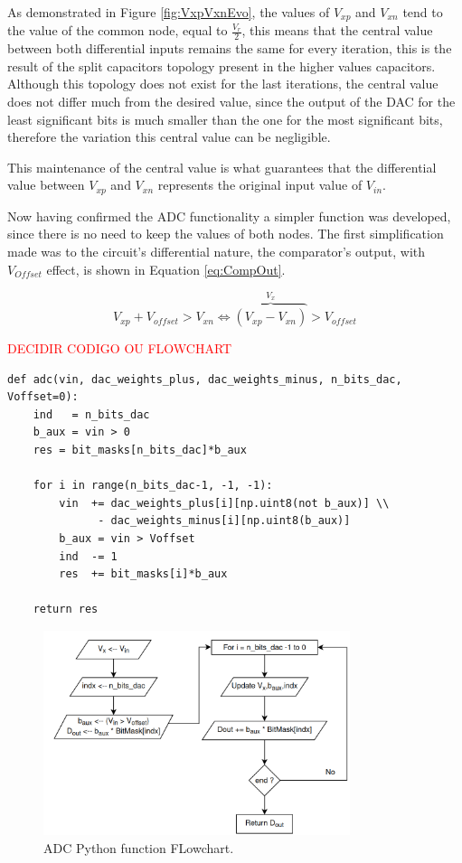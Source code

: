 As demonstrated in Figure \ref{fig:VxpVxnEvo}, the values of $V_{xp}$ and $V_{xn}$ tend to the value of the common node, equal to $\frac{V_r}{2}$, this means that the central value between both differential inputs remains the same for every iteration, this is the result of the split capacitors topology present in the higher values capacitors. Although this topology does not exist for the last iterations, the central value does not differ much from the desired value, since the output of the DAC for the least significant bits is much smaller than the one for the most significant bits, therefore the variation this central value can be negligible.

This maintenance of the central value is what guarantees that the differential value between $V_{xp}$ and $V_{xn}$ represents the original input value of $V_{in}$.

Now having confirmed the ADC functionality a simpler function was developed, since there is no need to keep the values of both nodes.
The first simplification made was to the circuit's differential nature, the comparator's output, with $V_{Offset}$ effect, is shown in Equation \ref{eq:CompOut}.

\begin{equation}
    V_{xp} + V_{offset} > V_{xn} \Leftrightarrow \overbrace{( V_{xp} - V_{xn} )}^{V_x} > V_{offset} 
    \label{eq:CompOut}
\end{equation}

\textcolor{red}{DECIDIR CODIGO OU FLOWCHART}

\begin{lstlisting}[caption={ADC Function}]
def adc(vin, dac_weights_plus, dac_weights_minus, n_bits_dac, Voffset=0):
    ind   = n_bits_dac  
    b_aux = vin > 0
    res = bit_masks[n_bits_dac]*b_aux

    for i in range(n_bits_dac-1, -1, -1):
        vin  += dac_weights_plus[i][np.uint8(not b_aux)] \\
              - dac_weights_minus[i][np.uint8(b_aux)]
        b_aux = vin > Voffset
        ind  -= 1
        res  += bit_masks[i]*b_aux

    return res
\end{lstlisting}


\begin{figure}[h]

    \centering
    \includegraphics*[width=0.8\textwidth]{Images/ADCPythonFlowChart.png}
    \caption{ADC Python function FLowchart.}

    \label{fig:ADCFlowChart}
\end{figure}

